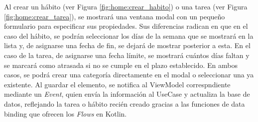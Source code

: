 Al crear un hábito (ver Figura \ref{fig:home:crear_habito}) o una tarea (ver Figura \ref{fig:home:crear_tarea}), se mostrará una ventana modal con un pequeño formulario para especificar sus propiedades. Sus diferencias radican en que en el caso del hábito, se podrán seleccionar los días de la semana que se mostrará en la lista y, de asignarse una fecha de fin, se dejará de mostrar posterior a esta. En el caso de la tarea, de asignarse una fecha límite, se mostrará cuántos días faltan y se marcará como atrasada si no se cumple en el plazo establecido. En ambos casos, se podrá crear una categoría directamente en el modal o seleccionar una ya existente. Al guardar el elemento, se notifica al ViewModel correspndiente mediante un \textit{Event}, quien envía la información al UseCase y actualiza la base de datos, reflejando la tarea o hábito recién creado gracias a las funciones de data binding que ofrecen los \textit{Flows} \cite{Flows} en Kotlin.

